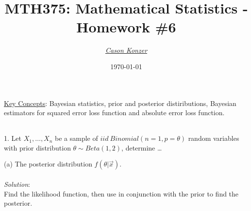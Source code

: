\documentclass[12pt]{article}
\newcommand{\XB}{\color{black}}
\newcommand{\XBB}{\color{blue}}
\newcommand{\XV}{\color{violet}}
\begin{document}
\title{\textbf{MTH375}: Mathematical Statistics - Homework \#6}
\date{\today}
\author{\XV\textit{\large{\href{https://github.com/casonk}{Cason Konzer}}}\XB}

\maketitle
\hrulefill
\vfill
    \underline{Key Concepts}: Bayesian statistics, prior and posterior distiributions,
    Bayesian estimators for squared error loss function and absolute error loss function.

\newpage
\newpage
\XBB\hrulefill\XB \\

1. Let $ X_{1}, \dots , X_{n} $ be a sample of $ iid \ Binomial(n = 1, p = \theta) $ random variables
with prior distribution $ \theta \sim Beta(1, 2) $, determine \dots \\

\XBB\hrulefill\XB
\vspace{5mm}

(a) The posterior distribution $ f(\theta | \overrightarrow{x}) $. \\
\vspace{2.5mm} \\
\textit{Solution}:
\vspace{2.5mm} \\

\noindent
Find the likelihood function, then use in conjunction with the prior to find the posterior. \\
\end{document}
